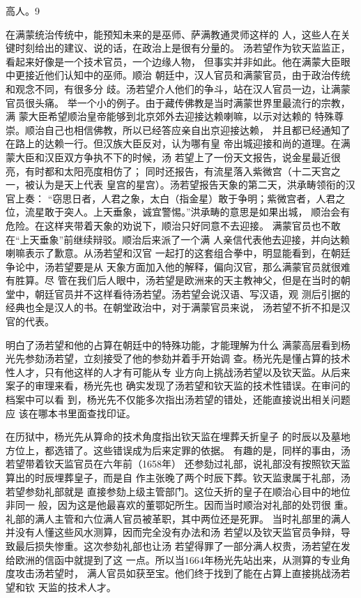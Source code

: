 高人。9%
\par
在满蒙统治传统中，能预知未来的是巫师、萨满教通灵师这样的%
人，这些人在关键时刻给出的建议、说的话，在政治上是很有分量的。%
汤若望作为钦天监监正，看起来好像是一个技术官员，一个边缘人物，%
但事实并非如此。他在满蒙大臣眼中更接近他们认知中的巫师。顺治%
朝廷中，汉人官员和满蒙官员，由于政治传统和观念不同，有很多分%
歧。汤若望介人他们的争斗，站在汉人官员一边，让满蒙官员很头痛。%
举一个小的例子。由于藏传佛教是当时满蒙世界里最流行的宗教，满%
蒙大臣希望顺治皇帝能够到北京郊外去迎接达赖喇嘛，以示对达赖的%
特殊尊崇。顺治自己也相信佛教，所以已经答应亲自出京迎接达赖，%
并且都已经通知了在路上的达赖一行。但汉族大臣反对，认为哪有皇%
帝出城迎接和尚的道理。在满蒙大臣和汉臣双方争执不下的时候，汤%
若望上了一份天文报告，说金星最近很亮，有时都和太阳亮度相仿了；%
同时还报告，有流星落入紫微宫（十二天宫之一，被认为是天上代表%
皇宫的星宫）。汤若望报告天象的第二天，洪承畴领衔的汉官上奏：%
“窃思日者，人君之象，太白（指金星）敢于争明；紫微宫者，人君之%
位，流星敢于突人。上天垂象，诚宜警惕。”洪承畴的意思是如果出城，%
顺治会有危险。在这样夹带着天象的劝说下，顺治只好同意不去迎接。%
满蒙官员也不敢在“上天垂象”前继续辩驳。顺治后来派了一个满%
人亲信代表他去迎接，并向达赖喇嘛表示了歉意。从汤若望和汉官%
一起打的这套组合拳中，明显能看到，在朝廷争论中，汤若望要是从%
天象方面加入他的解释，偏向汉官，那么满蒙官员就很难有胜算。尽%
管在我们后人眼中，汤若望是欧洲来的天主教神父，但是在当时的朝%
堂中，朝廷官员并不这样看待汤若望。汤若望会说汉语、写汉语，观%
测后引据的经典也全是汉人的书。在朝堂政治中，对于满蒙官员来说，%
汤若望不折不扣是汉官的代表。%
\par
明白了汤若望和他的占算在朝廷中的特殊功能，才能理解为什么%
满蒙高层看到杨光先参劾汤若望，立刻接受了他的参劾并着手开始调%
查。杨光先是懂占算的技术性人才，只有他这样的人才有可能从专%
业方向上挑战汤若望以及钦天监。从后来案子的审理来看，杨光先也%
确实发现了汤若望和钦天监的技术性错误。在审问的档案中可以看%
到，杨光先不仅能多次指出汤若望的错处，还能直接说出相关问题应%
该在哪本书里面查找印证。%
\par
在历狱中，杨光先从算命的技术角度指出钦天监在埋葬夭折皇子%
的时辰以及墓地方位上，都选错了。这些错误成为后来定罪的依据。%
有趣的是，同样的事由，汤若望带着钦天监官员在六年前（1658年）%
还参劾过礼部，说礼部没有按照钦天监算出的时辰埋葬皇子，而是自%
作主张晚了两个时辰下葬。钦天监隶属于礼部，汤若望参劾礼部就是%
直接参劾上级主管部门。这位夭折的皇子在顺治心目中的地位非同一%
般，因为这是他最喜欢的董鄂妃所生。因而当时顺治对礼部的处罚很%
重。礼部的满人主管和六位满人官员被革职，其中两位还是死罪。%
当时礼部里的满人并没有人懂这些风水测算，因而完全没有办法和汤%
若望以及钦天监官员争辩，导致最后损失惨重。这次参劾礼部也让汤%
若望得罪了一部分满人权贵，汤若望在发给欧洲的信函中就提到了这%
一点。所以当1664年杨光先站出来，从测算的专业角度攻击汤若望时，%
满人官员如获至宝。他们终于找到了能在占算上直接挑战汤若望和钦%
天监的技术人才。%
